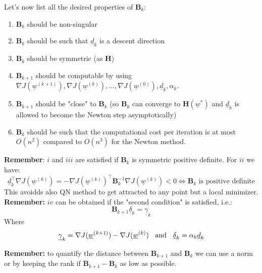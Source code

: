 Let's now list all the desired properties of $\mathbf{B}_k$:
\begin{enumerate}[i]
    \item $\textbf{B}_k$ should be non-singular
    \item $\textbf{B}_k$ should be such that $\underline{d}_k$ is a descent direction
    \item $\textbf{B}_k$ should be symmetric (as $\textbf{H}$)
    \item $\textbf{B}_{k+1}$ should be computable by using $\nabla J(\underline{w}^{(k+1)}), \nabla J(\underline{w}^{(k)}), \dots, \nabla J(\underline{w}^{(0)}), \underline{d}_k, \alpha_k$.
    \item $\textbf{B}_{k+1}$ should be "close" to $\textbf{B}_{k}$ (so $\textbf{B}_{k}$ can converge to $\textbf{H}(\underline{w}^*)$ and $\underline{d}_k$ is allowed to become the Newton step asymptotically)
    \item $\textbf{B}_{k}$ should be such that the computational cost per iteration is at most $O(n^2)$ compared to $O(n^3)$ for the Newton method. 
\end{enumerate}

\textbf{Remember}: $i$ and $iii$ are satisfied if $\textbf{B}_k$ is symmetric positive definite. For $ii$ we have:
\[
    \underline{d}_k^\intercal \nabla J(\underline{w}^{(k)}) = -\nabla J(\underline{w}^{(k)})^\intercal \mathbf{B}_k^{-1} \nabla J(\underline{w}^{(k)}) < 0 \iff \textbf{B}_k \text{ is positive definite}    
\]
This avoidds also QN method to get attracted to any point but a local minimizer.\\

\textbf{Remember: } $iv$ can be obtained if the "second condition" is satisfied, i.e.:
\[
    \mathbf{B}_{k+1} \underline{\delta}_k = \underline{\gamma}_k   
\]
Where
\[
    \underline{\gamma}_k = \nabla J(\underline{w}^{(k+1)}) - \nabla J(\underline{w}^{(k)}) \hspace{0.2cm} \text{ and } \hspace{0.2cm} \underline{\delta}_k = \alpha_k \underline{d}_k
\]

\textbf{Remember: } to quantify the distance between $\textbf{B}_{k+1}$ and $\textbf{B}_{k}$ we can use a norm or by keeping the rank if $\textbf{B}_{k+1} - \textbf{B}_{k}$ as low as possible.\\

